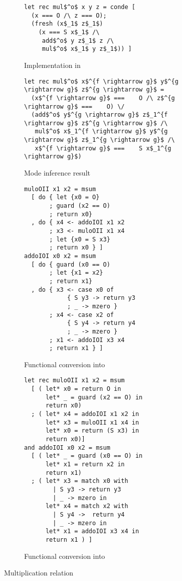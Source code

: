 \begin{figure}[h]
  \centering
  \begin{subfigure}[b]{0.45\textwidth}
    \begin{lstlisting}[frame=tb]
let rec mul$^o$ x y z = conde [
  (x === O /\ z === O);
  (fresh (x$_1$ z$_1$)
    (x === S x$_1$ /\
     add$^o$ y z$_1$ z /\
     mul$^o$ x$_1$ y z$_1$)) ]
    \end{lstlisting}
   \caption{Implementation in \mk}
    \label{fig:mult_mk}
  \end{subfigure}
  \hfill
  \begin{subfigure}[b]{0.45\textwidth}
    \begin{lstlisting}[frame=tb]
let rec mul$^o$ x$^{f \rightarrow g}$ y$^{g \rightarrow g}$ z$^{g \rightarrow g}$ =
  (x$^{f \rightarrow g}$ ===    O /\ z$^{g \rightarrow g}$ ===    O) \/
  (add$^o$ y$^{g \rightarrow g}$ z$_1^{f \rightarrow g}$ z$^{g \rightarrow g}$ /\
   mul$^o$ x$_1^{f \rightarrow g}$ y$^{g \rightarrow g}$ z$_1^{g \rightarrow g}$ /\
   x$^{f \rightarrow g}$ ===    S x$_1^{g \rightarrow g}$)
    \end{lstlisting}
    \caption{Mode inference result}
    \label{fig:mult_modded}
  \end{subfigure}

  \hfill

  \begin{subfigure}[b]{0.45\textwidth}
    \begin{lstlisting}[frame=tb]
muloOII x1 x2 = msum
  [ do { let {x0 = O}
       ; guard (x2 == O)
       ; return x0}
  , do { x4 <- addoIOI x1 x2
       ; x3 <- muloOII x1 x4
       ; let {x0 = S x3}
       ; return x0 } ]
addoIOI x0 x2 = msum
  [ do { guard (x0 == O)
       ; let {x1 = x2}
       ; return x1}
  , do { x3 <- case x0 of
            { S y3 -> return y3
            ; _ -> mzero }
       ; x4 <- case x2 of
            { S y4 -> return y4
            ; _ -> mzero }
       ; x1 <- addoIOI x3 x4
       ; return x1 } ]
    \end{lstlisting}
    \caption{Functional conversion into \haskell}
    \label{fig:mult_haskell}
  \end{subfigure}
\hfill
  \begin{subfigure}[b]{0.45\textwidth}
    \begin{lstlisting}[frame=tb]
let rec muloOII x1 x2 = msum
  [ ( let* x0 = return O in
      let* _ = guard (x2 == O) in
      return x0)
  ; ( let* x4 = addoIOI x1 x2 in
      let* x3 = muloOII x1 x4 in
      let* x0 = return (S x3) in
      return x0)]
and addoIOI x0 x2 = msum
  [ ( let* _ = guard (x0 == O) in
      let* x1 = return x2 in
      return x1)
  ; ( let* x3 = match x0 with
        | S y3 -> return y3
        | _ -> mzero in
      let* x4 = match x2 with
        | S y4 ->  return y4
        | _ -> mzero in
      let* x1 = addoIOI x3 x4 in
      return x1 ) ]
    \end{lstlisting}
    \caption{Functional conversion into \ocaml}
    \label{fig:mult_ocaml}
  \end{subfigure}

  \caption{Multiplication relation}
  \label{fig:mult}
\end{figure}
